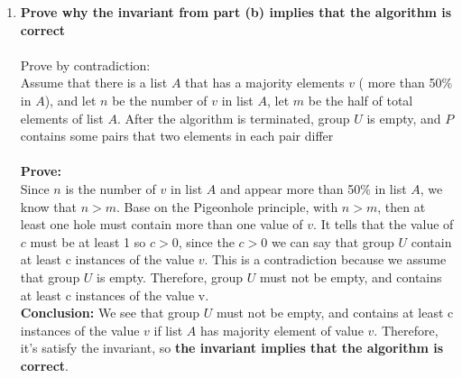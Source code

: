 \documentclass[11pt]{article}
\newenvironment{qparts}{\begin{enumerate}[{(}a{)}]}{\end{enumerate}}
\begin{document}
\begin{qparts}
\item
\Large{\textbf{Prove why the invariant from part (b) implies that the algorithm is correct}}\\\\
\Large{Prove by contradiction:}\\
Assume that there is a list $A$ that has a majority elements $v$ ( more than 50\% in $A$), and let $n$ be the number of $v$ in list $A$, let $m$ be the half of total elements of list $A$. After the algorithm is terminated, group $U$ is empty, and $P$ contains some pairs that two elements in each pair differ\\\\
\textbf{\Large{Prove:}}\\
\tab Since $n$ is the number of $v$ in list $A$ and appear more than 50\%  in list $A$, we know that $n > m$. Base on the Pigeonhole principle, with $n > m$, then at least one hole must contain more than one value of $v$. It tells that the value of $c$ must be at least 1 so $c > 0$, since the $c > 0$ we can say that group $U$ contain at least c instances of the value $v$. This is a contradiction because we assume that group $U$ is empty. Therefore, group $U$ must not be empty, and contains at least c instances of the value v.\\
\Large{\textbf{Conclusion:}} 
We see that group $U$ must not be empty, and contains at least c instances of the value $v$ if list $A$ has majority element of value $v$. Therefore, it's satisfy the invariant, so \textbf{the invariant implies that the algorithm is correct}.


\end{qparts}


\end{document}
